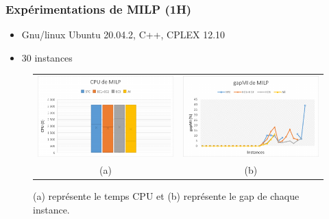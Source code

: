 \documentclass[hyperref={bookmarks=false},aspectratio=169]{beamer}
\begin{document}
\begin{frame}
 \addtocounter{framenumber}{-1}
\frametitle{Expérimentations de MILP (1H)}%

\begin{itemize}
\item Gnu/linux Ubuntu 20.04.2, C++, CPLEX 12.10
\item 30 instances
\end{itemize}
\begin{figure}[H]
	\centering
	\begin{tabular}{c c}
		\includegraphics[width=6.5cm]{figures/slide_CPU_MILP_INST_VAR.pdf}&%
		\includegraphics[width=6.5cm]{figures/slide_GAPMI_MILP_INST_VAR.pdf}%
		\\
		(a) & (b)
	\end{tabular}
	\caption{ (a) représente le temps CPU et (b) représente le gap de chaque instance.}\label{gapMI_cpu_RMILP_INST_VAR}%
\end{figure}

\end{frame}
\end{document}

